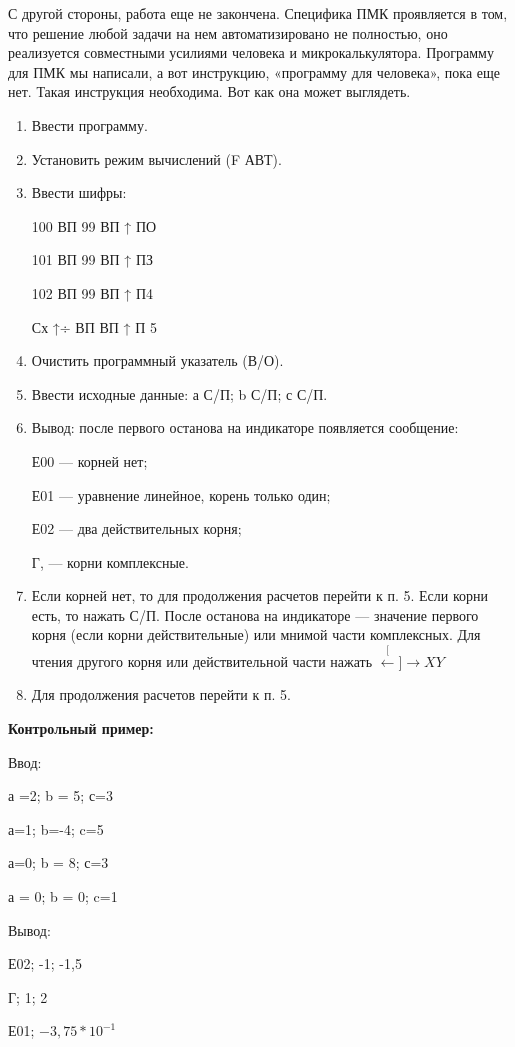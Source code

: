 \documentclass[11pt,a4paper,oneside]{article}
\def\XY{$\stackrel[\leftarrow]{\rightarrow}{XY}$}
\begin{document}
С другой стороны, работа еще не закончена. Специфика ПМК проявляется в том, что решение любой задачи на нем автоматизировано не полностью, оно реализуется совместными усилиями человека и микрокалькулятора. Программу для ПМК мы написали, а вот инструкцию, «программу для человека», пока еще нет. Такая инструкция необходима. Вот как она может выглядеть.

\begin{enumerate}
\item Ввести программу.
\item Установить режим вычислений (F АВТ).
\item Ввести шифры:

100 	ВП 99 ВП ↑ ПО

101 	ВП 99 ВП ↑ ПЗ

102 	ВП 99 ВП ↑ П4 

Сх ↑÷ ВП ВП ↑ П 5

\item Очистить программный указатель (В/О).
\item Ввести исходные данные: а С/П; b С/П; с С/П.
\item Вывод: после первого останова на индикаторе появляется сообщение:

Е00 — корней нет;

Е01 — уравнение линейное, корень только один;

Е02 — два действительных корня; 

Г, — корни комплексные.

\item Если корней нет, то для продолжения расчетов перейти к п. 5. Если корни есть, то нажать С/П. После останова на индикаторе — значение первого корня (если корни действительные) или мнимой части комплексных. Для чтения другого корня или действительной части нажать \XY
\item Для продолжения расчетов перейти к п. 5.
\end{enumerate}

\textbf{Контрольный пример:}

Ввод:

а =2; b = 5; с=3

а=1; b=-4; c=5 

а=0; b = 8; с=3 

а = 0; b = 0; c=1

Вывод: 

Е02; -1; -1,5 

Г; 1;	2

Е01; $-3,75*10^{-1}$ 
\end{document}
